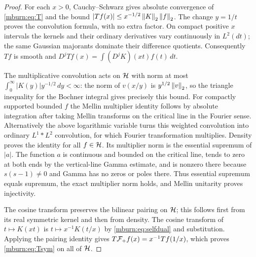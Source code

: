 \documentclass[11pt]{article}
\begin{document}
\begin{proof}
For each $x>0$, Cauchy--Schwarz gives absolute convergence of
\eqref{mburn:eq:T} and the bound
$|Tf(x)|\leq x^{-1/2}\left\lVert K\right\rVert_2\left\lVert f\right\rVert_2$.
The change $y=1/t$ proves the convolution formula, with no extra
factor. On compact positive $x$ intervals the kernels and their
ordinary derivatives vary continuously in $L^2(dt)$; the same
Gaussian majorants dominate their difference quotients. Consequently
$Tf$ is smooth and $D^jTf(x)=\int(D^jK)(xt)f(t)\,dt$.

The multiplicative convolution acts on $\mathcal H$ with norm at most
$\int_0^\infty|K(y)|y^{-1/2}\,dy<\infty$:
the norm of $v(x/y)$ is $y^{1/2}\left\lVert v\right\rVert_2$, so the triangle
inequality for the Bochner integral gives precisely this bound.
For compactly supported bounded $f$ the Mellin multiplier identity
follows by absolute integration after taking Mellin transforms on
the critical line in the Fourier sense. Alternatively the above
logarithmic variable turns this weighted convolution into ordinary
$L^1*L^2$ convolution, for which Fourier transformation multiplies.
Density proves the identity for all $f\in\mathcal H$. Its multiplier
norm is the essential supremum of $|a|$. The function $a$ is
continuous and bounded on the critical line, tends to zero at both
ends by the vertical-line Gamma estimate, and is nonzero there
because $s(s-1)\ne0$ and Gamma has no zeros or poles there.
Thus essential supremum equals supremum, the exact multiplier
norm holds, and Mellin unitarity proves injectivity.

The cosine transform preserves the bilinear pairing on $\mathcal H$;
this follows first from its real symmetric kernel and then from
density. The cosine transform of $t\mapsto K(xt)$ is
$t\mapsto x^{-1}K(t/x)$ by \eqref{mburn:eq:selfdual} and substitution.
Applying the pairing identity gives $T\mathcal F_+ f(x)=x^{-1}Tf(1/x)$,
which proves \eqref{mburn:eq:Tsym} on all of $\mathcal H$.


\end{proof}
\end{document}
